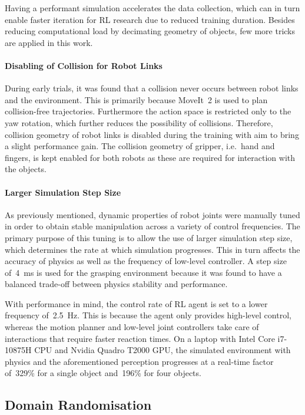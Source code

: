 Having a performant simulation accelerates the data collection, which can in turn enable faster iteration for RL research due to reduced training duration. Besides reducing computational load by decimating geometry of objects, few more tricks are applied in this work.

\newpage

\paragraph{Disabling of Collision for Robot Links} During early trials, it was found that a collision never occurs between robot links and the environment. This is primarily because MoveIt~2 is used to plan collision-free trajectories. Furthermore the action space is restricted only to the yaw rotation, which further reduces the possibility of collisions. Therefore, collision geometry of robot links is disabled during the training with aim to bring a slight performance gain. The collision geometry of gripper, i.e.~hand and fingers, is kept enabled for both robots as these are required for interaction with the objects.

\paragraph{Larger Simulation Step Size} As previously mentioned, dynamic properties of robot joints were manually tuned in order to obtain stable manipulation across a variety of control frequencies. The primary purpose of this tuning is to allow the use of larger simulation step size, which determines the rate at which simulation progresses. This in turn affects the accuracy of physics as well as the frequency of low-level controller. A step size of~4~ms is used for the grasping environment because it was found to have a balanced trade-off between physics stability and performance.

\bigskip

With performance in mind, the control rate of RL agent is set to a lower frequency of~2.5~Hz. This is because the agent only provides high-level control, whereas the motion planner and low-level joint controllers take care of interactions that require faster reaction times. On a laptop with Intel Core i7-10875H CPU and Nvidia Quadro T2000 GPU, the simulated environment with physics and the aforementioned perception progresses at a real-time factor of~329\% for a single object and~196\% for four objects.

\subsection{Domain Randomisation}\label{sec:impl_domain_randomisation}

